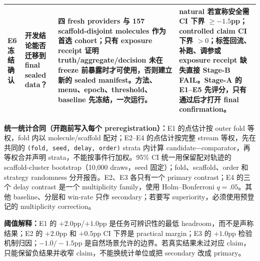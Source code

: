\documentclass[10pt,letterpaper]{article}
\newenvironment{clean}{\begin{center}\fontsize{8.55}{10.05}\selectfont\setlength{\tabcolsep}{3.7pt}\renewcommand{\arraystretch}{1.04}}{\end{center}}
\begin{document}
\begin{clean}
\begin{tabular}{@{}p{.09\linewidth}p{.25\linewidth}p{.40\linewidth}p{.15\linewidth}@{}}
E6 冻结确认 & 开发结论能否迁移到 final sealed data？ & 四 fresh providers 与 157 scaffold-disjoint molecules 作为首选 cohort；只有 exposure receipt 证明 truth/aggregate/decision 未在 freeze 前暴露时才可使用，否则建立新的 sealed manifest。方法、menu、epoch、threshold、baseline 先冻结，一次运行。 & natural 若宣称安全需 CI 下界 $\ge-1.5$pp；controlled claim CI 下界 $>0$；标签回流、补跑、调参或 exposure receipt 缺失直接 Stage-B FAIL。Stage-A 的 E1--E5 先评分，只有通过后才打开 final confirmation。\\
\bottomrule
\end{tabular}
\end{clean}
\textbf{统一统计合同（开跑前写入每个 preregistration）：}E1 的点估计按 outer fold 等权，fold 内以 molecule/scaffold 配对；E2--E4 的点估计按完整 stream 等权，先在共同的 \texttt{(fold, seed, delay, order)} strata 内计算 candidate$-$comparator，再等权合并声明 strata，不能按事件行加权。95\% CI 统一用保留配对轨迹的 scaffold-cluster bootstrap（10,000 draws，seed 固定）；fold、scaffold、order 和 strategy randomness 分开报告。E2、E3 各只有一个 primary contrast；E4 的三个 delay contrast 是一个 multiplicity family，使用 Holm--Bonferroni $q=.05$。其他 baseline、分层和 win-rate 只作 secondary；若要写 superiority，必须使用预登记的 multiplicity correction。

\textbf{阈值解释：}E1 的 $+2.0$pp/$+1.0$pp 是任务可辨识性的最低 headroom，而不是声称结果；E2 的 $+2.0$pp 和 $+0.5$pp CI 下界是 practical margin；E3 的 $+1.0$pp 检验机制归因；$-1.0/-1.5$pp 是自然场景允许的边界。若真实结果未过对应 claim，只能保留负结果并收窄 claim，不能换统计单位或把 secondary 改成 primary。
\end{document}
